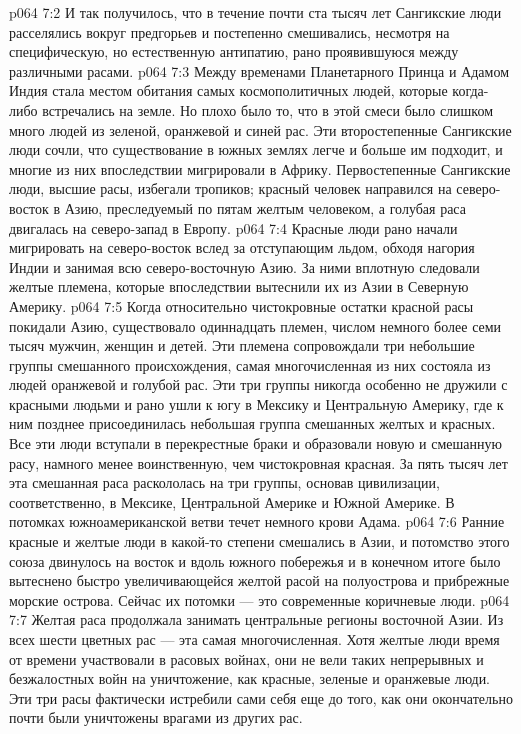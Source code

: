 \vs p064 7:2 И так получилось, что в течение почти ста тысяч лет Сангикские люди расселялись вокруг предгорьев и постепенно смешивались, несмотря на специфическую, но естественную антипатию, рано проявившуюся между различными расами.
\vs p064 7:3 Между временами Планетарного Принца и Адамом Индия стала местом обитания самых космополитичных людей, которые когда\hyp{}либо встречались на земле. Но плохо было то, что в этой смеси было слишком много людей из зеленой, оранжевой и синей рас. Эти второстепенные Сангикские люди сочли, что существование в южных землях легче и больше им подходит, и многие из них впоследствии мигрировали в Африку. Первостепенные Сангикские люди, высшие расы, избегали тропиков; красный человек направился на северо\hyp{}восток в Азию, преследуемый по пятам желтым человеком, а голубая раса двигалась на северо\hyp{}запад в Европу.
\vs p064 7:4 Красные люди рано начали мигрировать на северо\hyp{}восток вслед за отступающим льдом, обходя нагория Индии и занимая всю северо\hyp{}восточную Азию. За ними вплотную следовали желтые племена, которые впоследствии вытеснили их из Азии в Северную Америку.
\vs p064 7:5 Когда относительно чистокровные остатки красной расы покидали Азию, существовало одиннадцать племен, числом немного более семи тысяч мужчин, женщин и детей. Эти племена сопровождали три небольшие группы смешанного происхождения, самая многочисленная из них состояла из людей оранжевой и голубой рас. Эти три группы никогда особенно не дружили с красными людьми и рано ушли к югу в Мексику и Центральную Америку, где к ним позднее присоединилась небольшая группа смешанных желтых и красных. Все эти люди вступали в перекрестные браки и образовали новую и смешанную расу, намного менее воинственную, чем чистокровная красная. За пять тысяч лет эта смешанная раса раскололась на три группы, основав цивилизации, соответственно, в Мексике, Центральной Америке и Южной Америке. В потомках южноамериканской ветви течет немного крови Адама.
\vs p064 7:6 Ранние красные и желтые люди в какой\hyp{}то степени смешались в Азии, и потомство этого союза двинулось на восток и вдоль южного побережья и в конечном итоге было вытеснено быстро увеличивающейся желтой расой на полуострова и прибрежные морские острова. Сейчас их потомки --- это современные коричневые люди.
\vs p064 7:7 Желтая раса продолжала занимать центральные регионы восточной Азии. Из всех шести цветных рас --- эта самая многочисленная. Хотя желтые люди время от времени участвовали в расовых войнах, они не вели таких непрерывных и безжалостных войн на уничтожение, как красные, зеленые и оранжевые люди. Эти три расы фактически истребили сами себя еще до того, как они окончательно почти были уничтожены врагами из других рас.
